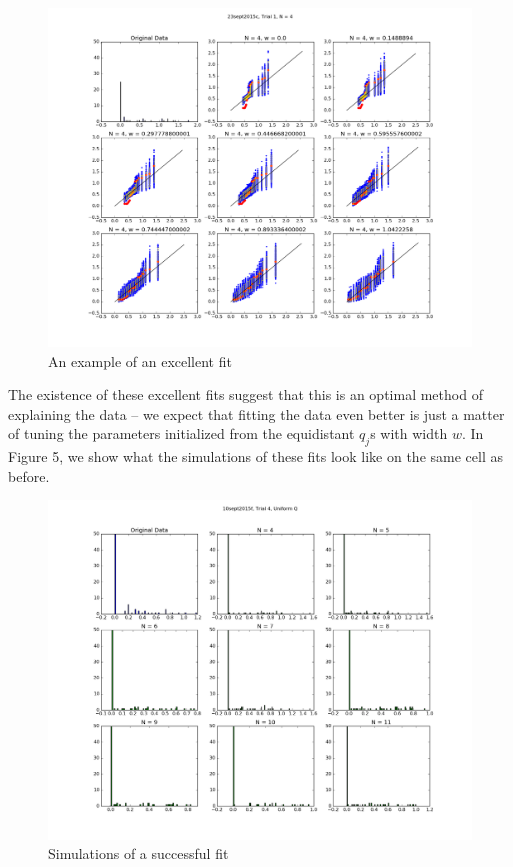 \documentclass{article}
\begin{document}
\begin{figure}[h]
  \centering
  \caption{An example of an excellent fit}
  \includegraphics[width=1.0\textwidth]{23sept2015c-1-4-qq}
\end{figure}

The existence of these excellent fits suggest that this is an optimal method of explaining the data -- we expect that fitting the data even better is just a matter of tuning the parameters initialized from the equidistant $q_j$s with width $w$. In Figure 5, we show what the simulations of these fits look like on the same cell as before.

\begin{figure}[h]
  \centering
  \caption{Simulations of a successful fit}
  \includegraphics[width=1.0\textwidth]{10sept2015f-4-uq}
\end{figure}
\end{document}
